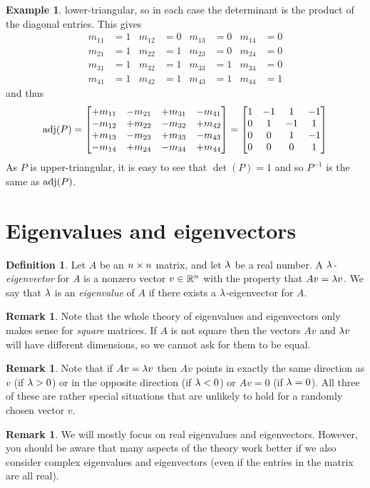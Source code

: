 \documentclass[reqno]{amsart}
\theoremstyle{definition}
\newtheorem{remark}[theorem]{Remark}
\newtheorem{definition}[theorem]{Definition}
\newtheorem{example}[theorem]{Example}
\newcommand{\dfn}[1]{\emph{{#1}}\index{#1}}
\begin{document}
\begin{example}
 lower-triangular, so in each case the determinant is the product of
 the diagonal entries.  This gives
 \begin{align*}
  m_{11} &= 1 &
  m_{12} &= 0 &
  m_{13} &= 0 &
  m_{14} &= 0 \\
  m_{21} &= 1 &
  m_{22} &= 1 &
  m_{23} &= 0 &
  m_{24} &= 0 \\
  m_{31} &= 1 &
  m_{32} &= 1 &
  m_{33} &= 1 &
  m_{34} &= 0 \\
  m_{41} &= 1 &
  m_{42} &= 1 &
  m_{43} &= 1 &
  m_{44} &= 1
 \end{align*}
 and thus
 \[
  \operatorname{adj}(P) =
   \left[\begin{matrix} +m_{11} & -m_{21} & +m_{31} & -m_{41} \\
        -m_{12} & +m_{22} & -m_{32} & +m_{42} \\
        +m_{13} & -m_{23} & +m_{33} & -m_{43} \\
        -m_{14} & +m_{24} & -m_{34} & +m_{44}
   \end{matrix}\right]
   =
   \left[\begin{matrix}
     1 & -1 &  1 & -1 \\
     0 &  1 & -1 &  1 \\
     0 &  0 &  1 & -1 \\
     0 &  0 &  0 &  1
   \end{matrix}\right]
 \]
 As $P$ is upper-triangular, it is easy to see that $\det(P)=1$ and so
 $P^{-1}$ is the same as $\operatorname{adj}(P)$. 
\end{example}

\section{Eigenvalues and eigenvectors}
\label{sec-eigen}

\begin{definition}\label{defn-eigen}
 Let $A$ be an $n\times n$ matrix, and let $\lambda$ be a real number.  A
 \emph{$\lambda$-eigenvector} for $A$ is a nonzero
 vector $v\in{\mathbb{R}}^n$ with the property that $Av=\lambda v$.  We say that
 $\lambda$ is an \dfn{eigenvalue} of $A$ if there exists a
 $\lambda$-eigenvector for $A$. 
\end{definition}

\begin{remark}\label{rem-eigen-square}
 Note that the whole theory of eigenvalues and eigenvectors only makes
 sense for \emph{square} matrices.  If $A$ is not square then the
 vectors $Av$ and $\lambda v$ will have different dimensions, so we cannot
 ask for them to be equal.
\end{remark}
\begin{remark}
 Note that if $Av=\lambda v$ then $Av$ points in exactly the same direction
 as $v$ (if $\lambda>0$) or in the opposite direction (if $\lambda<0$) or
 $Av=0$ (if $\lambda=0$).  All three of these are rather special situations
 that are unlikely to hold for a randomly chosen vector $v$.
\end{remark}
\begin{remark}\label{rem-eigen-complex}
 We will mostly focus on real eigenvalues and eigenvectors.  However,
 you should be aware that many aspects of the theory work better if we
 also consider complex eigenvalues and eigenvectors (even if the
 entries in the matrix are all real).
\end{remark}
\end{document}
